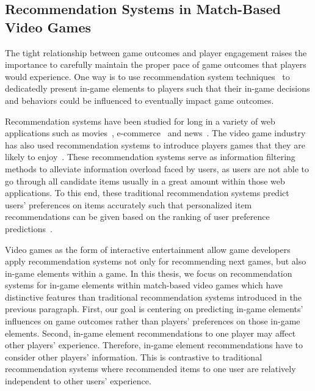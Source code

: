 

\subsection{Recommendation Systems in Match-Based Video Games}

The tight relationship between game outcomes and player engagement raises the importance to carefully maintain the proper pace of game outcomes that players would experience. One way is to use recommendation system techniques~\cite{medler2011using} to dedicatedly present in-game elements to players such that their in-game decisions and behaviors could be influenced to eventually impact game outcomes.

Recommendation systems have been studied for long in a variety of web applications such as movies~\cite{amatriain2012netflix}, e-commerce~\cite{linden2003amazon} and news~\cite{das2007google}. The video game industry has also used recommendation systems to introduce players games that they are likely to enjoy~\cite{sifa2014archetypal,orland10,skocir2012mars,wu2017recommendation}. These recommendation systems serve as information filtering methods to alleviate information overload faced by users, as users are not able to go through all candidate items usually in a great amount within those web applications. To this end, these traditional recommendation systems predict users' preferences on items accurately such that personalized item recommendations can be given based on the ranking of user preference predictions~\cite{liang2006personalized}. 

Video games as the form of interactive entertainment allow game developers apply recommendation systems not only for recommending next games, but also in-game elements within a game. In this thesis, we focus on recommendation systems for in-game elements within match-based video games which have distinctive features than traditional recommendation systems introduced in the previous paragraph. First, our goal is centering on predicting in-game elements' influences on game outcomes rather than players' preferences on those in-game elements. Second, in-game element recommendations to one player may affect other players' experience. Therefore, in-game element recommendations have to consider other players' information. This is contrastive to traditional recommendation systems where recommended items to one user are relatively independent to other users' experience.

